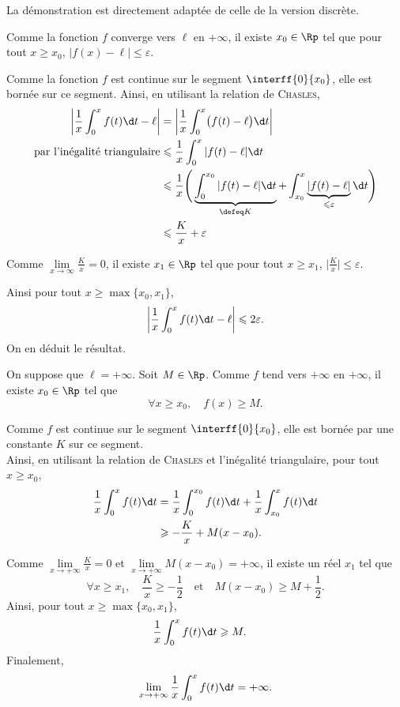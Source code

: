 \begin{solution}
La démonstration est directement adaptée de celle de la version discrète. 
\begin{reponses}
\item Comme la fonction $f$ converge vers $\ell$ en $+ \infty$, il existe $x_0 \in \Rp$ tel que pour tout $x \geqslant x_0$, $|f(x) - \ell| \leqslant \varepsilon$. \\

\item Comme la fonction $f$ est continue sur le segment $\interff{0}{x_0}$, elle est bornée sur ce segment. Ainsi, en utilisant la relation de \textsc{Chasles},
\begin{align*}
\left| \frac{1}{x} \int_0^x f(t) \d t - \ell \right| &= \left| \frac{1}{x} \int_0^x \mathopen{}\big(f(t) - \ell\big) \d t \right| \\
\text{par l'inégalité triangulaire} &\leqslant \frac{1}{x} \int_0^x |f(t) - \ell| \d t \\
&\leqslant \frac{1}{x} \Bigg( \underbrace{\int_{0}^{x_0} |f(t) - \ell| \d t}_{\defeq K} + \int_{x_0}^{x} \underbrace{|f(t) - \ell|}_{\leqslant \varepsilon} \d t \Bigg) \\
&\leqslant \frac{K}{x} + \varepsilon
\end{align*}

\item Comme $\lim\limits_{x \to \infty} \frac{K}{x} = 0$, il existe $x_1 \in \Rp$ tel que pour tout $x \geqslant x_1$, $ \big| \frac{K}{x} \big| \leqslant \varepsilon$.

Ainsi pour tout $x \geqslant \max \{ x_0, x_1 \}$, 
$$\left| \frac{1}{x} \int_0^x f(t) \d t - \ell \right| \leqslant 2 \varepsilon.$$
On en déduit le résultat. 

\item On suppose que $\ell = +\infty$. Soit $M \in \Rp$. Comme $f$ tend vers $+\infty$ en $+\infty$, il existe $x_0 \in \Rp$ tel que
\[
\forall x \geqslant x_0,\quad f(x) \geqslant M.
\]

Comme $f$ est continue sur le segment $\interff{0}{x_0}$, elle est bornée par une constante $K$ sur ce segment. \\
Ainsi, en utilisant la relation de \textsc{Chasles} et l'inégalité triangulaire, pour tout $x \geqslant x_0$,
\begin{align*}
\frac{1}{x} \int_0^x f(t) \d t
&= \frac{1}{x} \int_0^{x_0} f(t) \d t + \frac{1}{x} \int_{x_0}^x f(t) \d t\\
&\geqslant -\frac{K}{x} + M (x - x_0).
\end{align*}

Comme $\lim\limits_{x\to+\infty} \frac{K}{x} = 0$ et $\lim\limits_{x\to+\infty} M (x - x_0) = +\infty$, il existe un réel $x_1$ tel que
\[
\forall x \geqslant x_1,\quad \frac{K}{x} \geqslant -\frac{1}{2} \quad \text{et} \quad M (x - x_0) \geqslant M + \frac{1}{2}.
\]
Ainsi, pour tout $x \geqslant \max\{x_0, x_1\}$,
\begin{align*}
\frac{1}{x} \int_0^x f(t) \d t
&\geqslant M.
\end{align*}
Finalement, 
\[
\lim\limits_{x\to+\infty} \frac{1}{x}\int_0^x f(t) \d t = +\infty.
\]
\end{reponses}
\end{solution}